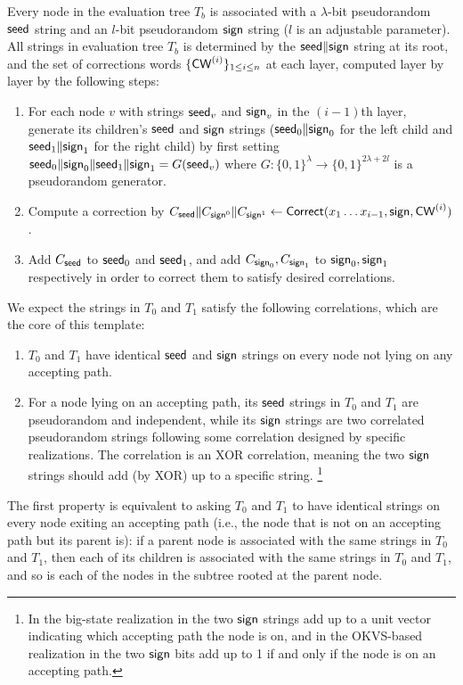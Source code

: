 Every node in the evaluation tree $T_b$ is associated with a $\lambda$-bit pseudorandom ${\sf seed}$ string and an $l$-bit pseudorandom ${\sf sign}$ string ($l$ is an adjustable parameter). 
All strings in evaluation tree $T_b$ is determined by the ${\sf seed}\|{\sf sign}$ string at its root, and the set of corrections words $\{{\sf CW}^{(i)}\}_{1\le i\le n}$ at each layer,  computed layer by layer by the following steps: 
\begin{enumerate}[itemsep=5pt]
    \item For each node $v$ with strings ${\sf seed}_v$ and ${\sf sign}_v$ in the $(i-1)$th layer, generate its children's ${\sf seed}$ and ${\sf sign}$ strings (${\sf seed}_0\|{\sf sign}_0$ for the left child and ${\sf seed}_1\|{\sf sign}_1$ for the right child) by first setting ${\sf seed}_0\|{\sf sign}_0\|{\sf seed}_1\|{\sf sign}_1 = G({\sf seed}_v)$ where $G:\{0,1\}^\lambda\rightarrow \{0,1\}^{2\lambda+2l}$ is a pseudorandom generator.
    \item Compute a correction by $C_{\sf seed}\|C_{{\sf sign}^0}\|C_{{\sf sign}^1}\gets{\sf Correct}(x_1\dots x_{i-1}, {\sf sign}, {\sf CW}^{(i)})$.
    \item Add $C_{\sf seed}$ to ${\sf seed}_0$ and ${\sf seed}_1$, and add $C_{{\sf sign}_0},C_{{\sf sign}_1}$ to ${\sf sign}_0,{\sf sign}_1$ respectively in order to correct them to satisfy desired correlations. 
\end{enumerate}
We expect the strings in $T_0$ and $T_1$ satisfy the following correlations, which are the core of this template: 
\begin{enumerate}
  \item\label{enu:tree_invariance_1}$T_0$ and $T_1$ have identical ${\sf seed}$ and ${\sf sign}$ strings on every node not lying on any accepting path.
  \item\label{enu:tree_invariance_2} For a node lying on an accepting path, its ${\sf seed}$ strings in $T_0$ and $T_1$ are pseudorandom and independent, while its ${\sf sign}$ strings are two correlated pseudorandom strings following some  correlation designed by specific realizations. The correlation is an XOR correlation, meaning the two ${\sf sign}$ strings should add (by XOR) up to a specific string. %
  \footnote[1]{In the big-state realization in  the two ${\sf sign}$ strings add up to a unit vector indicating which accepting path the node is on, and in the OKVS-based realization in  the two ${\sf sign}$ bits add up to 1 if and only if the node is on an accepting path. }
\end{enumerate}  
The first property is equivalent to asking $T_0$ and $T_1$ to have identical strings on every node exiting an accepting path (i.e., the node that is not on an accepting path but its parent is): if a parent node is associated with the same strings in $T_0$ and $T_1$, then each of its children is associated with the same strings in $T_0$ and $T_1$, and so is each of the nodes in the subtree rooted at the parent node. 

